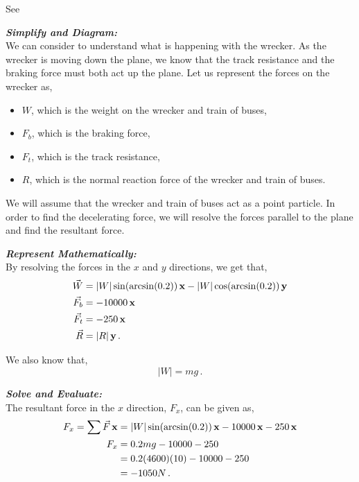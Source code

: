 \begin{subquestions}
\subquestion

\begin{subsubquestions}
	
\subsubquestion 

See 


\subsubquestion

\textbf{\textit{Simplify and Diagram:}} \\
We can consider  to understand what is happening with the wrecker. As the wrecker is moving down the plane, we know that the track resistance and the braking force must both act up the plane. Let us represent the forces on the wrecker as,
\begin{itemize}
	\item $W$, which is the weight on the wrecker and train of buses,
	\item $F_b$, which is the braking force, 
	\item $F_t$, which is the track resistance,
	\item $R$, which is the normal reaction force of the wrecker and train of buses.
\end{itemize}
We will assume that the wrecker and train of buses act as a point particle. In order to find the decelerating force, we will resolve the forces parallel to the plane and find the resultant force.




\textbf{\textit{Represent Mathematically:}} \\
By resolving the forces in the $x$ and $y$ directions, we get that,
\begin{align}
	\vec{W} & = |W|\sin(\arcsin(0.2))\,\mathbf{x} - |W|\cos(\arcsin(0.2))\,\mathbf{y} \nonumber \\
	\vec{F_b} & = -10000\,\mathbf{x} \nonumber \\
	\vec{F_t} & = -250\,\mathbf{x} \nonumber \\
	\vec{R} & = |R|\,\mathbf{y} \,.
\end{align}

We also know that,
\begin{equation}
	|W|=mg \,.
\end{equation}




\textbf{\textit{Solve and Evaluate:}} \\
The resultant force in the $x$ direction, $F_x$, can be given as,
\begin{align}
	F_x = \sum \vec{F}\,\mathbf{x} & = |W|\sin(\arcsin(0.2))\,\mathbf{x} -10000\,\mathbf{x}-250\,\mathbf{x} \nonumber \\
	F_x & = 0.2mg -10000-250 \nonumber \\
	    & = 0.2(4600)(10) -10000-250 \nonumber \\
	    & = -1050 N \,.
\end{align}


\end{subsubquestions}
\end{subquestions}
